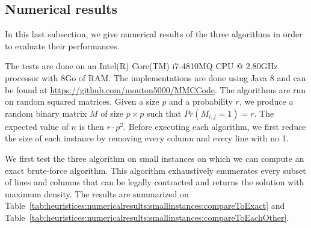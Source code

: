 \subsection{Numerical results}

In this last subsection, we give numerical results of the three algorithms in order to evaluate their performances.

The tests are done on an Intel(R) Core(TM) i7-4810MQ CPU @ 2.80GHz processor with 8Go of RAM. The implementations are done using Java 8 and can be found at \url{https://github.com/mouton5000/MMCCode}. The algorithms are run on random squared matrices. Given a size $p$ and a probability $r$, we produce a random binary matrix $M$ of size $p \times p$ such that $Pr(M_{i,j} = 1) = r$. The expected value of $n$ is then $r \cdot p^2$. Before executing each algorithm, we first reduce the size of each instance by removing every column and every line with no 1.

We first test the three algorithm on small instances on which we can compute an exact brute-force algorithm. This algorithm exhaustively enumerates every subset of lines and columns that can be legally contracted and returns the solution with maximum density. The results are summarized on Table~\ref{tab:heuristices:numericalresults:smallinstances:compareToExact} and  Table~\ref{tab:heuristices:numericalresults:smallinstances:compareToEachOther}.

